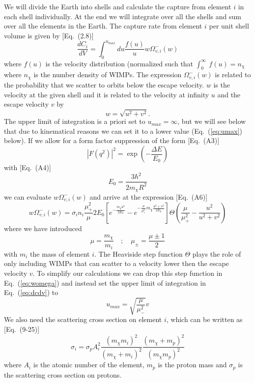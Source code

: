 \documentclass[a4paper,10pt,oneside]{book}
\begin{document}
We will divide the Earth into shells and calculate the capture from
element $i$ in each shell individually. At the end we will integrate
over all the shells and sum over all the elements in the Earth. The
capture rate from element $i$ per unit shell volume is given by
\cite{Gould:1987ir}[Eq.~(2.8)] 
\begin{equation}
\label{eq:dcdv}
    \frac{dC_i}{dV} = \int_0^{u_{max}} du \frac{f(u)}{u} w \Omega_{v,i}^-(w)
\end{equation}
where $f(u)$ is the velocity distribution (normalized such that
$\int_0^\infty\ f(u) = n_\chi$ where $n_\chi$ is the number density of
WIMPs. The expression $\Omega_{v,i}^-(w)$ is related to the
probability that we scatter to orbits below the escape velocity. $w$
is the velocity at the given shell and it is related to the velocity
at infinity $u$ and the escape velocity $v$ by 
\begin{equation}
   w = \sqrt{u^2 + v^2}.
\end{equation}
The upper limit of integration is a priori set to $u_{max} = \infty$,
but we will see below that due to kinematical reasons we can set it to
a lower value (Eq.~(\ref{eq:umax}) below). 
If we allow for a form factor suppression of the form \cite{Gould:1987ir}[Eq.~(A3)]
\begin{equation}
   |F(q^2)|^2 = \exp\left( - \frac{\Delta E}{E_0} \right)
\end{equation}
with \cite{Gould:1987ir}[Eq.~(A4)]
\begin{equation}
   E_0 = \frac{3 \hbar^2}{2m_\chi R^2}
\end{equation}
we can evaluate $w \Omega_{v,i}^-(w)$ and arrive at the expression
\cite{Gould:1987ir}[Eq.~(A6)] 
\begin{equation}
\label{eq:womega}
   w \Omega_{v,i}^- (w) = \sigma_i n_i \frac{\mu_+^2}{\mu}2 E_0 \left[
   e^{- \frac{m_\chi u^2}{2E_0}} - e^{-\frac{\mu}{\mu_+^2}m_\chi \frac{u^2+v^2}{2E_0}}
   \right] \Theta\left( \frac{\mu}{\mu_+^2} - \frac{u^2}{u^2+v^2} \right)
\end{equation}
where we have introduced
\begin{equation}
   \mu = \frac{m_\chi}{m_i} \quad ; \quad \mu_\pm = \frac{\mu \pm 1}{2}
\end{equation}
with $m_i$ the mass of element $i$. The Heaviside step function
$\Theta$ plays the role of only including WIMPs that can scatter to a
velocity lower then the escape velocity $v$. To simplify our
calculations we can drop this step function in Eq.~(\ref{eq:womega})
and instead set the upper limit of integration in Eq.~(\ref{eq:dcdv})
to 
\begin{equation}
\label{eq:umax}
  u_{max} = \sqrt{\frac{\mu}{\mu_-^2}} v
\end{equation}
We also need the scattering cross section on element $i$, which can be
written as 
\cite{Jungman:1995df}[Eq.~(9-25)]
\begin{equation}
\label{eq:sigma_i}
   \sigma_i = \sigma_p A_i^2 \frac{(m_\chi m_i)^2}{(m_\chi+m_i)^2} 
   \frac{(m_\chi + m_p)^2}{(m_\chi m_p)^2}
\end{equation}
where $A_i$ is the atomic number of the element, $m_p$ is the proton
mass and $\sigma_p$ is the scattering cross section on protons. 
\end{document}
